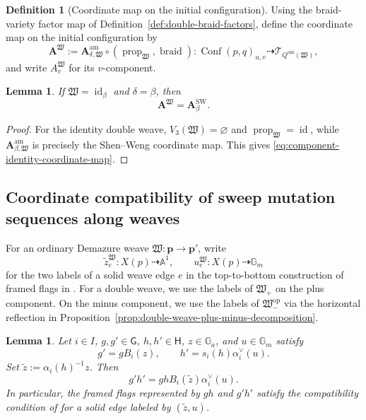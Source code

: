 \documentclass[10pt,a4paper]{article}
\newtheorem{lemma}[theorem]{Lemma}
\theoremstyle{definition}
\newtheorem{definition}[theorem]{Definition}
\theoremstyle{remark}
\newcommand{\Gm}{\mathbb G_m}
\newcommand{\groupG}{\mathsf{G}}
\newcommand{\torusH}{\mathsf{H}}
\newcommand{\Conf}{\operatorname{Conf}}
\newcommand{\Tcal}{\mathcal T}
\newcommand{\fW}{\mathfrak W}
\newcommand{\id}{\operatorname{id}}
\begin{document}
\begin{definition}[Coordinate map on the initial configuration]
\label{def:component-intermediate-functions}
Using the braid-variety factor map of
Definition~\ref{def:double-braid-factors}, define the coordinate map on the
initial configuration by
\begin{equation}
 \mathbf A^\fW
 :=
 \mathbf A_{\delta,\fW}^{\mathrm{am}}
 \circ(\operatorname{prop}_{\fW},\operatorname{braid}):
 \Conf(p,q)_{u,v}
 \dashrightarrow\Tcal_{Q^{\mathrm{am}}(\fW)},
 \label{eq:component-partial-coordinate-map}
\end{equation}
and write \(A_v^\fW\) for its \(v\)-component.
\end{definition}

\begin{lemma}
\label{lem:component-terminal-functions-well-defined}
If \(\fW=\id_\beta\) and \(\delta=\beta\), then
\begin{equation}
 \mathbf A^\fW=\mathbf A_\beta^{\mathrm{SW}}.
 \label{eq:component-identity-coordinate-map}
\end{equation}
\end{lemma}

\begin{proof}
For the identity double weave, \(V_3(\fW)=\varnothing\) and
\(\operatorname{prop}_{\fW}=\id\), while
\(\mathbf A_{\beta,\fW}^{\mathrm{am}}\) is precisely the Shen--Weng
coordinate map.  This gives
\eqref{eq:component-identity-coordinate-map}.
\end{proof}

\subsection{Coordinate compatibility of sweep mutation sequences along weaves}
\label{subsec:coordinate-compatibility}

For an ordinary Demazure weave \(\fW:\mathbf p\to\mathbf p'\), write
\[
 \widetilde z_e^{\fW}:X(p)\dashrightarrow\mathbb A^1,
 \qquad
 u_e^{\fW}:X(p)\dashrightarrow\Gm
\]
for the two labels of a solid weave edge \(e\) in the top-to-bottom
construction of framed flags in
\cite[Section~5]
{CasalsEtAlBraidVarieties}.  For a double weave, we use the labels of \(\fW_+\)
on the plus component.  On the minus component, we use the labels of
\(\fW_-^{\mathrm{op}}\) via the horizontal reflection in
Proposition~\ref{prop:double-weave-plus-minus-decomposition}.

\begin{lemma}
\label{lem:framed-edge-cartan-transport}
Let \(i\in I\), \(g,g'\in\groupG\), \(h,h'\in\torusH\),
\(z\in\mathbb G_a\), and \(u\in\Gm\) satisfy
\[
 g'=gB_i(z),
 \qquad
 h'=s_i(h)\alpha_i^\vee(u).
\]
Set \(\widetilde z:=\alpha_i(h)^{-1}z\).  Then
\begin{equation}
 g'h'=ghB_i(\widetilde z)\alpha_i^\vee(u).
 \label{eq:framed-edge-cartan-action}
\end{equation}
In particular, the framed flags represented by \(gh\) and \(g'h'\) satisfy
the compatibility condition of
\cite[Section~5]{CasalsEtAlBraidVarieties} for a solid edge labeled by
\((\widetilde z,u)\).
\end{lemma}
\end{document}
